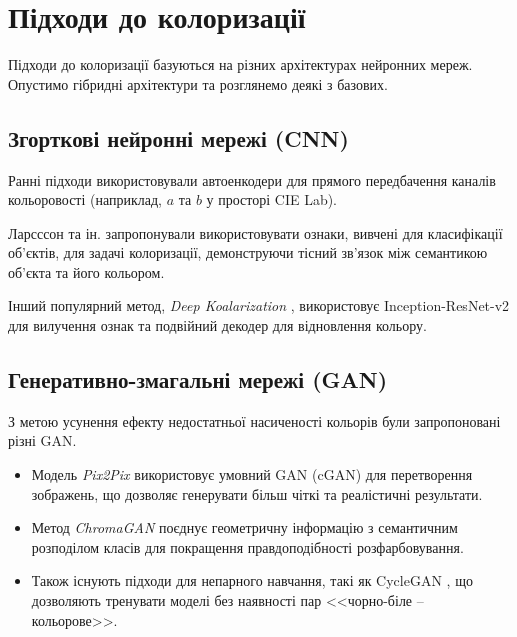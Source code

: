     \section{Підходи до колоризації}

        Підходи до колоризації базуються на різних архітектурах нейронних мереж.
        Опустимо гібридні архітектури та розглянемо деякі з базових.

        \subsection{Згорткові нейронні мережі (CNN)}
            Ранні підходи використовували автоенкодери для прямого передбачення каналів кольоровості (наприклад, $a$ та $b$ у просторі CIE Lab).

            Ларсссон та ін. \cite{2016-learning-representations-for-automatic-colorization, 2016-colorful-image-colorization} запропонували використовувати ознаки, вивчені для класифікації об'єктів, для задачі колоризації, демонструючи тісний зв'язок між семантикою об'єкта та його кольором.

            Інший популярний метод, \textit{Deep Koalarization} \cite{2017-deep-koalarization}, використовує Inception-ResNet-v2 для вилучення ознак та подвійний декодер для відновлення кольору.

        \subsection{Генеративно-змагальні мережі (GAN)}
            З метою усунення ефекту недостатньої насиченості кольорів були запропоновані різні GAN.

            \begin{itemize}[label=$\bullet$] 
                \item Модель \textit{Pix2Pix} \cite{2017-image-to-image-translation} використовує умовний GAN (cGAN) для перетворення зображень, що дозволяє генерувати більш чіткі та реалістичні результати.
                \item Метод \textit{ChromaGAN} \cite{2020-chromagan} поєднує геометричну інформацію з семантичним розподілом класів для покращення правдоподібності розфарбовування.
                \item Також існують підходи для непарного навчання, такі як CycleGAN \cite{2017-unpaired-image-to-image-translation}, що дозволяють тренувати моделі без наявності пар <<чорно-біле -- кольорове>>.
            \end{itemize}

